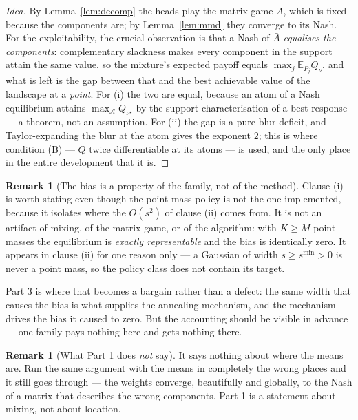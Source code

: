 \documentclass[11pt]{article}
\theoremstyle{definition}
\newtheorem{remark}[theorem]{Remark}
\newcommand{\E}{\mathbb{E}}
\newcommand{\cA}{\mathcal{A}}
\begin{document}
\begin{proof}[Idea]
By Lemma~\ref{lem:decomp} the heads play the matrix game $\bar A$, which is fixed
because the components are; by Lemma~\ref{lem:mmd} they converge to its Nash. For
the exploitability, the crucial observation is that a Nash of $\bar A$
\emph{equalises the components}: complementary slackness makes every component in
the support attain the same value, so the mixture's expected payoff equals
$\max_j \E_{P_j} Q_\nu$, and what is left is the gap between that and the best
achievable value of the landscape at a \emph{point}. For (i) the two are equal,
because an atom of a Nash equilibrium attains $\max_\cA Q_{\nu^\star}$ by the
support characterisation of a best response --- a theorem, not an assumption. For
(ii) the gap is a pure blur deficit, and Taylor-expanding the blur at the atom
gives the exponent $2$; this is where condition (B) --- $Q$ twice differentiable at
its atoms --- is used, and the only place in the entire development that it is.
\end{proof}

\begin{remark}[The bias is a property of the family, not of the method]
\label{rem:biasfamily}
Clause (i) is worth stating even though the point-mass policy is not the one
implemented, because it isolates where the $O(s^2)$ of clause (ii) comes from.
It is not an artifact of mixing, of the matrix game, or of the algorithm: with
$K \ge M$ point masses the equilibrium is \emph{exactly representable} and the
bias is identically zero. It appears in clause (ii) for one reason only --- a
Gaussian of width $s \ge s^{\min} > 0$ is never a point mass, so the policy class
does not contain its target.

Part 3 is where that becomes a bargain rather than a defect: the same width that
causes the bias is what supplies the annealing mechanism, and the mechanism drives
the bias it caused to zero. But the accounting should be visible in advance ---
one family pays nothing here and gets nothing there.
\end{remark}

\begin{remark}[What Part 1 does \emph{not} say]\label{rem:part1not}
It says nothing about where the means are. Run the same argument with the means
in completely the wrong places and it still goes through --- the weights converge,
beautifully and globally, to the Nash of a matrix that describes the wrong
components. Part 1 is a statement about mixing, not about location.
\end{remark}
\end{document}
